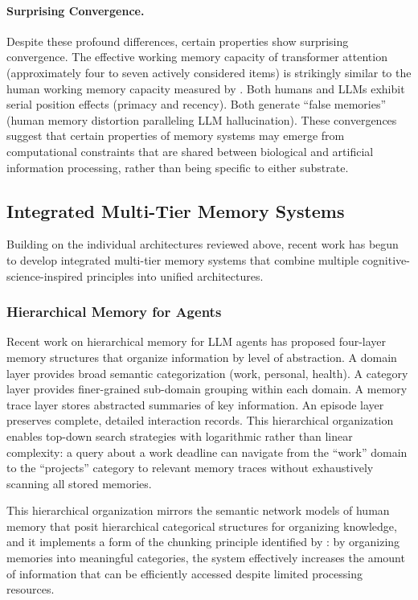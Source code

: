 \paragraph{Surprising Convergence.} Despite these profound differences, certain properties show surprising convergence. The effective working memory capacity of transformer attention (approximately four to seven actively considered items) is strikingly similar to the human working memory capacity measured by \citet{cowan2001magical}. Both humans and LLMs exhibit serial position effects (primacy and recency). Both generate ``false memories'' (human memory distortion paralleling LLM hallucination). These convergences suggest that certain properties of memory systems may emerge from computational constraints that are shared between biological and artificial information processing, rather than being specific to either substrate.

\subsection{Integrated Multi-Tier Memory Systems}

Building on the individual architectures reviewed above, recent work has begun to develop integrated multi-tier memory systems that combine multiple cognitive-science-inspired principles into unified architectures.

\subsubsection{Hierarchical Memory for Agents}

Recent work on hierarchical memory for LLM agents has proposed four-layer memory structures that organize information by level of abstraction. A domain layer provides broad semantic categorization (work, personal, health). A category layer provides finer-grained sub-domain grouping within each domain. A memory trace layer stores abstracted summaries of key information. An episode layer preserves complete, detailed interaction records. This hierarchical organization enables top-down search strategies with logarithmic rather than linear complexity: a query about a work deadline can navigate from the ``work'' domain to the ``projects'' category to relevant memory traces without exhaustively scanning all stored memories.

This hierarchical organization mirrors the semantic network models of human memory that posit hierarchical categorical structures for organizing knowledge, and it implements a form of the chunking principle identified by \citet{miller1956magical}: by organizing memories into meaningful categories, the system effectively increases the amount of information that can be efficiently accessed despite limited processing resources.

